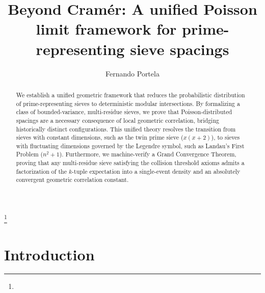 \documentclass{amsart}
\theoremstyle{definition}
\theoremstyle{remark}
\numberwithin{equation}{section}
\begin{document}
\title[Beyond Cramér: A unified Poisson limit framework]
{Beyond Cramér: A unified Poisson limit framework for prime-representing sieve spacings}


\author[F. Portela]{Fernando Portela}
\address{Ronin Institute for Independent Scholarship 2.0}
\curraddr{}
\thanks{}



\date{}

\dedicatory{}

\commby{}

\begin{abstract}
We establish a unified geometric framework that reduces the probabilistic distribution of
prime-representing sieves to deterministic modular intersections. By formalizing a class of
bounded-variance, multi-residue sieves, we prove that Poisson-distributed spacings are a
necessary consequence of local geometric correlation, bridging historically distinct
configurations. This unified theory resolves the transition from sieves with constant
dimensions, such as the twin prime sieve ($x(x+2)$), to sieves with fluctuating dimensions
governed by the Legendre symbol, such as Landau's First Problem ($n^2+1$). Furthermore, we
machine-verify a Grand Convergence Theorem, proving that any multi-residue sieve satisfying
the collision threshold axioms admits a factorization of the $k$-tuple expectation into a
single-event density and an absolutely convergent geometric correlation constant.
\end{abstract}

\maketitle

\section{Introduction} \label{sec:introduction}
\end{document}
